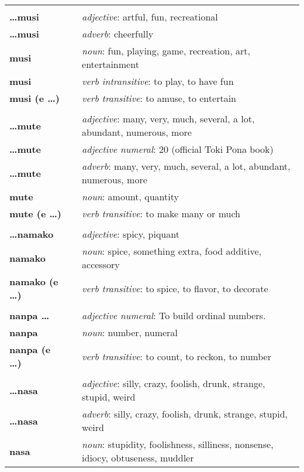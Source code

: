 \begin{supertabular}{p{2,5cm}|ll}
 && \\ %
\textbf{\dots musi} && \textit{adjective}: artful, fun, recreational \\ 
\textbf{\dots musi} && \textit{adverb}: cheerfully \\ 
\textbf{musi} && \textit{noun}: fun, playing, game, recreation, art, entertainment \\ 
\textbf{musi} && \textit{verb intransitive}: to play, to have fun \\ 
\textbf{musi (e \dots)} && \textit{verb transitive}: to amuse, to entertain \\ 
 && \\ %
\textbf{\dots mute} && \textit{adjective}: many, very, much, several, a lot, abundant, numerous, more \\ 
\textbf{\dots mute} && \textit{adjective numeral}: 20 (official Toki Pona book) \\ 
\textbf{\dots mute} && \textit{adverb}: many, very, much, several, a lot, abundant, numerous, more \\ 
\textbf{mute} && \textit{noun}: amount, quantity \\ 
\textbf{mute (e \dots)} && \textit{verb transitive}: to make many or much \\ 
 && \\ %
\textbf{\dots namako} && \textit{adjective}: spicy, piquant \\ 
\textbf{namako} && \textit{noun}: spice, something extra, food additive, accessory \\ 
\textbf{namako (e \dots)} && \textit{verb transitive}: to spice, to flavor, to decorate \\ 
 && \\ %
\textbf{nanpa \dots} && \textit{adjective numeral}: To build ordinal numbers. \\ 
\textbf{nanpa} && \textit{noun}: number, numeral \\ 
\textbf{nanpa (e \dots)} && \textit{verb transitive}: to count, to reckon,  to number \\ 
 && \\ %
\textbf{\dots nasa} && \textit{adjective}: silly, crazy, foolish, drunk, strange, stupid, weird \\ 
\textbf{\dots nasa} && \textit{adverb}: silly, crazy, foolish, drunk, strange, stupid, weird \\ 
\textbf{nasa} && \textit{noun}: stupidity, foolishness, silliness, nonsense, idiocy, obtuseness, muddler \\ 

\end{supertabular}
